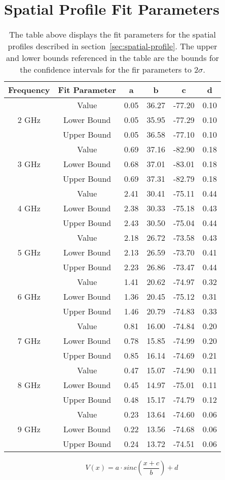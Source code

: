 \chapter{Spatial Profile Fit Parameters}
	\def\arraystretch{1}
	\begin{table*}[!h]
		\centering
			\begin{tabular}{||c | c || c c c c||}
				\hline
				Frequency & Fit Parameter & a & b & c & d \\ [0.5ex]
				\hline\hline
				\multirow{3}{4em}{2 GHz} & Value & 0.05 & 36.27 & -77.20 & 0.10	 \\
				& Lower Bound & 0.05 & 35.95 & -77.29 & 0.10 \\
				& Upper Bound & 0.05 & 36.58 & -77.10 & 0.10 \\
				\hline
				\multirow{3}{4em}{3 GHz} & Value & 0.69 & 37.16 & -82.90 & 0.18  \\
				& Lower Bound & 0.68 & 37.01 & -83.01 & 0.18 \\
				& Upper Bound & 0.69 & 37.31 & -82.79 & 0.18 \\
				\hline
				\multirow{3}{4em}{4 GHz} & Value & 2.41 & 30.41 & -75.11 & 0.44 \\
				& Lower Bound & 2.38 & 30.33 & -75.18 & 0.43 \\
				& Upper Bound & 2.43 & 30.50 & -75.04 & 0.44 \\
				\hline
				\multirow{3}{4em}{5 GHz} & Value & 2.18 & 26.72 & -73.58 & 0.43 \\
				& Lower Bound & 2.13 & 26.59 & -73.70 & 0.41 \\
				& Upper Bound & 2.23 & 26.86 & -73.47 & 0.44 \\
				\hline
				\multirow{3}{4em}{6 GHz} & Value & 1.41 & 20.62 & -74.97 & 0.32 \\
				& Lower Bound & 1.36 & 20.45 & -75.12 & 0.31 \\
				& Upper Bound & 1.46 & 20.79 & -74.83 & 0.33 \\
				\hline
				\multirow{3}{4em}{7 GHz} & Value & 0.81 & 16.00 & -74.84 & 0.20 \\
				& Lower Bound & 0.78 & 15.85 & -74.99 & 0.20 \\
				& Upper Bound & 0.85 & 16.14 & -74.69 & 0.21 \\
				\hline
				\multirow{3}{4em}{8 GHz} & Value & 0.47 & 15.07 & -74.90 & 0.11 \\
				& Lower Bound & 0.45 & 14.97 & -75.01 & 0.11 \\
				& Upper Bound & 0.48 & 15.17 & -74.79 & 0.12 \\
				\hline
				\multirow{3}{4em}{9 GHz} & Value & 0.23 & 13.64 & -74.60 & 0.06 \\
				& Lower Bound & 0.22 & 13.56 & -74.68 & 0.06 \\
				& Upper Bound & 0.24 & 13.72 & -74.51 & 0.06 \\
				\hline
			\end{tabular}
			\caption[Spatial Profile Fit Parameters]{The table above displays the fit parameters for the spatial profiles described in section~\ref{sec:spatial-profile}. The upper and lower bounds referenced in the table are the bounds for the confidence intervals for the fir parameters to $2\sigma$.}
		\end{table*}
\begin{equation}
\label{eq:vxrestate}
V(x) = a\cdot sinc\left(\frac{x+c}{b}\right) + d
\end{equation}
\clearpage
\newpage
